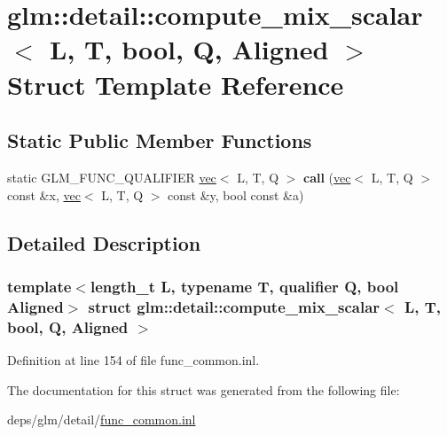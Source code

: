 \hypertarget{structglm_1_1detail_1_1compute__mix__scalar_3_01L_00_01T_00_01bool_00_01Q_00_01Aligned_01_4}{}\section{glm\+:\+:detail\+:\+:compute\+\_\+mix\+\_\+scalar$<$ L, T, bool, Q, Aligned $>$ Struct Template Reference}
\label{structglm_1_1detail_1_1compute__mix__scalar_3_01L_00_01T_00_01bool_00_01Q_00_01Aligned_01_4}
\subsection*{Static Public Member Functions}
\begin{DoxyCompactItemize}
\item 
\mbox{\label{structglm_1_1detail_1_1compute__mix__scalar_3_01L_00_01T_00_01bool_00_01Q_00_01Aligned_01_4_a34b102b44e5908978b3cd24b5ace0369}} 
static G\+L\+M\+\_\+\+F\+U\+N\+C\+\_\+\+Q\+U\+A\+L\+I\+F\+I\+ER \hyperlink{structglm_1_1vec}{vec}$<$ L, T, Q $>$ {\bfseries call} (\hyperlink{structglm_1_1vec}{vec}$<$ L, T, Q $>$ const \&x, \hyperlink{structglm_1_1vec}{vec}$<$ L, T, Q $>$ const \&y, bool const \&a)
\end{DoxyCompactItemize}


\subsection{Detailed Description}
\subsubsection*{template$<$length\+\_\+t L, typename T, qualifier Q, bool Aligned$>$\newline
struct glm\+::detail\+::compute\+\_\+mix\+\_\+scalar$<$ L, T, bool, Q, Aligned $>$}



Definition at line 154 of file func\+\_\+common.\+inl.



The documentation for this struct was generated from the following file\+:\begin{DoxyCompactItemize}
\item 
deps/glm/detail/\hyperlink{func__common_8inl}{func\+\_\+common.\+inl}\end{DoxyCompactItemize}
